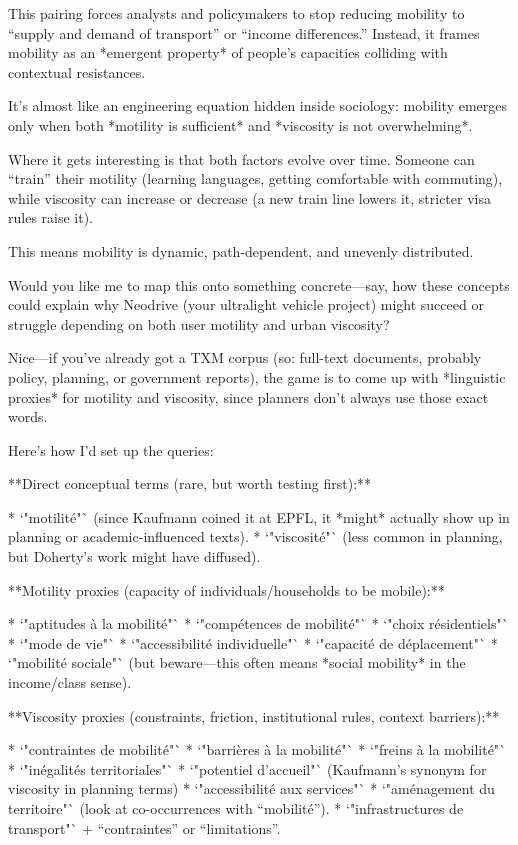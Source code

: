 This pairing forces analysts and policymakers to stop reducing mobility to “supply and demand of transport” or “income differences.” Instead, it frames mobility as an *emergent property* of people’s capacities colliding with contextual resistances.

It’s almost like an engineering equation hidden inside sociology: mobility emerges only when both *motility is sufficient* and *viscosity is not overwhelming*.

Where it gets interesting is that both factors evolve over time. Someone can “train” their motility (learning languages, getting comfortable with commuting), while viscosity can increase or decrease (a new train line lowers it, stricter visa rules raise it).

This means mobility is dynamic, path-dependent, and unevenly distributed.

Would you like me to map this onto something concrete—say, how these concepts could explain why Neodrive (your ultralight vehicle project) might succeed or struggle depending on both user motility and urban viscosity?






Nice—if you’ve already got a TXM corpus (so: full-text documents, probably policy, planning, or government reports), the game is to come up with *linguistic proxies* for motility and viscosity, since planners don’t always use those exact words.

Here’s how I’d set up the queries:

**Direct conceptual terms (rare, but worth testing first):**

* `"motilité"` (since Kaufmann coined it at EPFL, it *might* actually show up in planning or academic-influenced texts).
* `"viscosité"` (less common in planning, but Doherty’s work might have diffused).

**Motility proxies (capacity of individuals/households to be mobile):**

* `"aptitudes à la mobilité"`
* `"compétences de mobilité"`
* `"choix résidentiels"`
* `"mode de vie"`
* `"accessibilité individuelle"`
* `"capacité de déplacement"`
* `"mobilité sociale"` (but beware—this often means *social mobility* in the income/class sense).

**Viscosity proxies (constraints, friction, institutional rules, context barriers):**

* `"contraintes de mobilité"`
* `"barrières à la mobilité"`
* `"freins à la mobilité"`
* `"inégalités territoriales"`
* `"potentiel d’accueil"` (Kaufmann’s synonym for viscosity in planning terms)
* `"accessibilité aux services"`
* `"aménagement du territoire"` (look at co-occurrences with “mobilité”).
* `"infrastructures de transport"` + “contraintes” or “limitations”.

